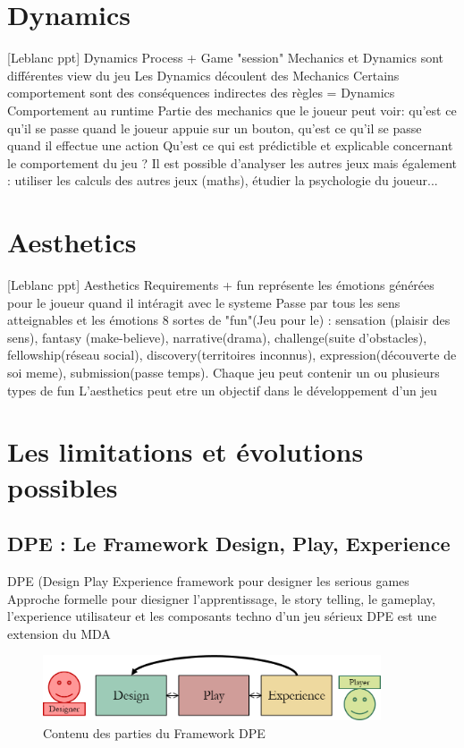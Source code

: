 \section{Dynamics}
[Leblanc ppt] Dynamics Process + Game "session"
Mechanics et Dynamics sont différentes view du jeu
Les Dynamics découlent des Mechanics
Certains comportement sont des conséquences indirectes des règles = Dynamics
Comportement au runtime
Partie des mechanics que le joueur peut voir: qu'est ce qu'il se passe quand le joueur appuie sur un bouton, qu'est ce qu'il se passe quand il effectue une action 
Qu'est ce qui est prédictible et explicable concernant le comportement du jeu ?
Il est possible d'analyser les autres jeux mais également : utiliser les calculs des autres jeux (maths), étudier la psychologie du joueur...



\section{Aesthetics}
[Leblanc ppt] Aesthetics Requirements + fun
représente les émotions générées pour le joueur quand il intéragit avec le systeme
Passe par tous les sens atteignables et les émotions
8 sortes de "fun"(Jeu pour le) : sensation (plaisir des sens), fantasy (make-believe), narrative(drama), challenge(suite d'obstacles), fellowship(réseau social), discovery(territoires inconnus), expression(découverte de soi meme), submission(passe temps).
Chaque jeu peut contenir un ou plusieurs types de fun
L'aesthetics peut etre un objectif dans le développement d'un jeu




\section{Les limitations et évolutions possibles}
\subsection{DPE : Le Framework Design, Play, Experience}
DPE (Design Play Experience framework pour designer les serious games
Approche formelle pour diesigner l'apprentissage, le story telling, le gameplay, l'experience utilisateur et les composants techno d'un jeu sérieux
DPE est une extension du MDA

\begin{figure}[H]
    \centering
    \includegraphics[width=10cm]{10_img/chap3/dpe.png} 
    \caption{Contenu des parties du Framework DPE \cite{Winn2011}}
\end{figure}

